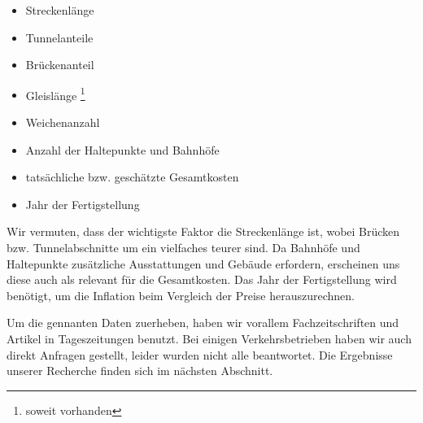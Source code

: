 \begin{itemize}
\item Streckenlänge
\item Tunnelanteile
\item Brückenanteil
\item Gleislänge \footnote{soweit vorhanden}\setcounter{fnnumber}{\thefootnote}
\item Weichenanzahl \footnotemark[\thefnnumber]
\item Anzahl der Haltepunkte und Bahnhöfe
\item tatsächliche bzw. geschätzte Gesamtkosten
\item Jahr der Fertigstellung
\end{itemize}

Wir vermuten, dass der wichtigste Faktor die Streckenlänge ist, wobei Brücken
bzw. Tunnelabschnitte um ein vielfaches teurer sind. Da Bahnhöfe und Haltepunkte
zusätzliche Ausstattungen und Gebäude erfordern, erscheinen uns diese auch als
relevant für die Gesamtkosten. Das Jahr der Fertigstellung wird benötigt, um die
Inflation beim Vergleich der Preise herauszurechnen.

Um die gennanten Daten zuerheben, haben wir vorallem Fachzeitschriften und
Artikel in Tageszeitungen benutzt. Bei einigen Verkehrsbetrieben haben wir auch
direkt Anfragen gestellt, leider wurden nicht alle beantwortet. Die Ergebnisse
unserer Recherche finden sich im nächsten Abschnitt.